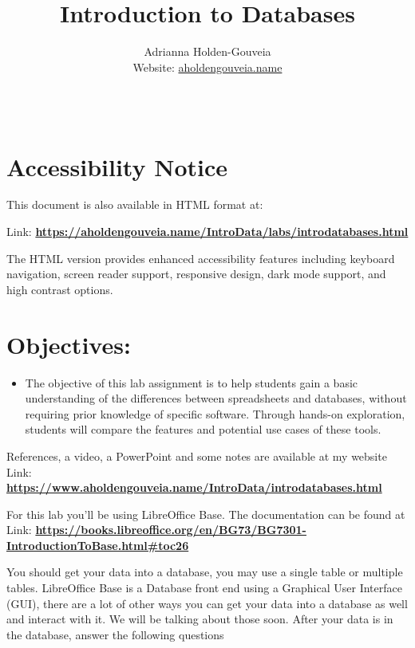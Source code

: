 \documentclass[12pt]{article}
\title{Introduction to Databases}
\author{
        Adrianna Holden-Gouveia \\
        Website: \href{https://aholdengouveia.name}{aholdengouveia.name}\\ 
        \date{\vspace{-5ex}}
        \faGithub {: aholdengouveia} \\
        }
\begin{document}
    

\maketitle



\section*{Accessibility Notice}
This document is also available in HTML format at:

Link: \href{https://aholdengouveia.name/IntroData/labs/introdatabases.html}{\textbf{https://aholdengouveia.name/IntroData/labs/introdatabases.html}}

The HTML version provides enhanced accessibility features including keyboard navigation, screen reader support, responsive design, dark mode support, and high contrast options.

\section*{Objectives:}
\begin{itemize}
    \item The objective of this lab assignment is to help students gain a basic understanding of the differences between spreadsheets and databases, without requiring prior knowledge of specific software. Through hands-on exploration, students will compare the features and potential use cases of these tools.
\end{itemize}


References, a video, a PowerPoint and some notes are available at my website
Link: \href{https://www.aholdengouveia.name/IntroData/introdatabases.html}{\textbf{https://www.aholdengouveia.name/IntroData/introdatabases.html}}

For this lab you'll be using LibreOffice Base.  The documentation can be found at Link: \href{https://books.libreoffice.org/en/BG73/BG7301-IntroductionToBase.html#toc26}{\textbf{https://books.libreoffice.org/en/BG73/BG7301-IntroductionToBase.html#toc26}}

You should get your data into a database, you may use a single table or multiple tables. LibreOffice Base is a Database front end using a Graphical User Interface (GUI), there are a lot of other ways you can get your data into a database as well and interact with it. We will be talking about those soon. After your data is in the database, answer the following questions
\end{document}
